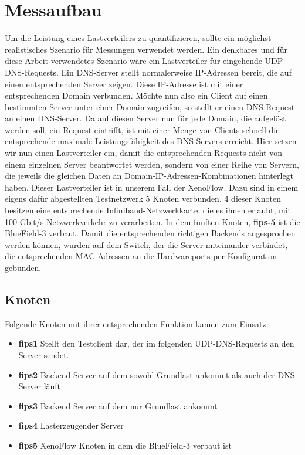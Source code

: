 \section{Messaufbau}
Um die Leistung eines Lastverteilers zu quantifizieren, sollte ein möglichst realistisches Szenario für Messungen verwendet werden. Ein denkbares und für diese Arbeit verwendetes Szenario wäre ein Lastverteiler für eingehende UDP-DNS-Requests. Ein DNS-Server stellt normalerweise IP-Adressen bereit, die auf einen entsprechenden Server zeigen. Diese IP-Adresse ist mit einer entsprechenden Domain verbunden. Möchte nun also ein Client auf einen bestimmten Server unter einer Domain zugreifen, so stellt er einen DNS-Request an einen DNS-Server. Da auf diesen Server nun für jede Domain, die aufgelöst werden soll, ein Request eintrifft, ist mit einer Menge von Clients schnell die entsprechende maximale Leistungsfähigkeit des DNS-Servers erreicht. Hier setzen wir nun einen Lastverteiler ein, damit die entsprechenden Requests nicht von einem einzelnen Server beantwortet werden, sondern von einer Reihe von Servern, die jeweils die gleichen Daten an Domain-IP-Adressen-Kombinationen hinterlegt haben. Dieser Lastverteiler ist in unserem Fall der XenoFlow. Dazu sind in einem eigens dafür abgestellten Testnetzwerk 5 Knoten verbunden. 4 dieser Knoten besitzen eine entsprechende Infiniband-Netzwerkkarte, die es ihnen erlaubt, mit 100 Gbit/s Netzwerkverkehr zu verarbeiten. In dem fünften Knoten, \textbf{fips-5} ist die BlueField-3 verbaut. Damit die entsprechenden richtigen Backends angesprochen werden können, wurden auf dem Switch, der die Server miteinander verbindet, die entsprechenden MAC-Adressen an die Hardwareports per Konfiguration gebunden.
\subsection{Knoten}
Folgende Knoten mit ihrer entsprechenden Funktion kamen zum Einsatz:
\begin{itemize}
    \item \textbf{fips1} Stellt den Testclient dar, der im folgenden UDP-DNS-Requests an den Server sendet.
    \item \textbf{fips2} Backend Server auf dem sowohl Grundlast ankommt als auch der DNS-Server läuft
    \item \textbf{fips3} Backend Server auf dem nur Grundlast ankommt
    \item \textbf{fips4} Lasterzeugender Server
    \item \textbf{fips5} XenoFlow Knoten in dem die BlueField-3 verbaut ist
\end{itemize}
